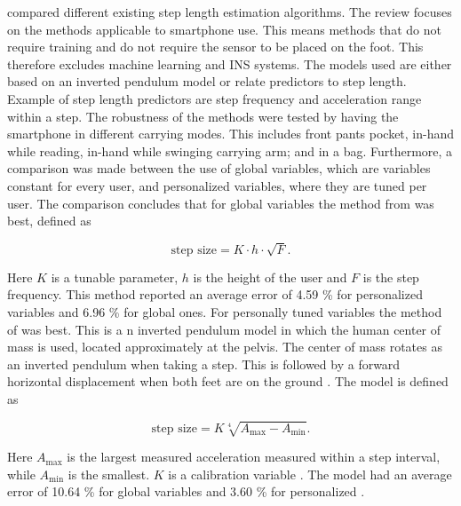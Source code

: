 \citet{Vezocnik2019} compared different existing step length estimation algorithms. The review focuses on the methods applicable to smartphone use. This means methods that do not require training and do not require the sensor to be placed on the foot. This therefore excludes machine learning and INS systems. The models used are either based on an inverted pendulum model or relate predictors to step length. Example of step length predictors are step frequency and acceleration range within a step. The robustness of the methods were tested by having the smartphone in different carrying modes. This includes front pants pocket, in-hand while reading, in-hand while  swinging carrying arm; and in a bag. Furthermore, a comparison was made between the use of global variables, which are variables constant for every user, and personalized variables, where they are tuned per user. The comparison concludes that for global variables the method from \cite{Tian2016} was best, defined as

\begin{equation}
	\label{eq:Tian2016_sle}
	\text{step size} = K \cdot h \cdot \sqrt{F}.
\end{equation}

Here $K$ is a tunable parameter, $h$ is the height of the user and $F$ is the step frequency. This method reported an average error of  4.59 \% for personalized variables and 6.96 \% for global ones. For personally tuned variables the method of \cite{Weinberg2002} was best. This is a n inverted pendulum model in which the human center of mass is used, located approximately at the pelvis. The center of mass rotates as an inverted pendulum when taking a step. This is followed by a forward horizontal displacement when both feet are on the ground \cite{Diez2018}. The model is defined as 

\begin{equation}
	\text{step size} =K \sqrt[4]{A_{\max }-A_{\min }}.
	\label{eq:weinberg_stepsize}
\end{equation}

Here $A_{\max}$ is the largest measured acceleration measured within a step interval, while $A_{\min}$ is the smallest. $K$ is a calibration variable  \cite{Weinberg2002,Diez2018}. The model had an average error of  10.64 \% for global variables and  3.60 \% for personalized \cite{Vezocnik2019}.

